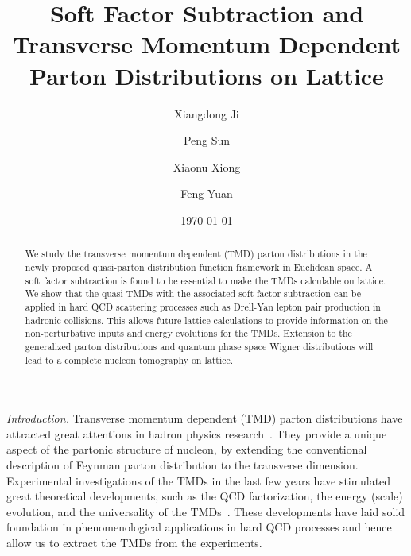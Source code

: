 \documentclass[aps,prd,preprint,tightenlines,superscriptaddress,nofootinbib]{revtex4}
\begin{document}
\title{Soft Factor Subtraction and Transverse Momentum Dependent Parton Distributions on Lattice}

\author{Xiangdong Ji}
\author{Peng Sun}
\author{Xiaonu Xiong}
\author{Feng Yuan}
\date{\today}
\vspace{0.5in}
\begin{abstract}
We study the transverse momentum dependent (TMD) parton distributions in 
the newly proposed quasi-parton distribution function framework in Euclidean
space. A soft factor subtraction is found to be essential to make the TMDs
calculable on lattice. We show that the quasi-TMDs with the associated soft
factor subtraction can be applied in hard QCD scattering 
processes such as Drell-Yan lepton pair production in hadronic collisions.
This allows future lattice calculations to provide information on
the non-perturbative inputs and energy evolutions for the TMDs.
Extension to the generalized parton distributions and quantum
phase space Wigner distributions will lead to a complete nucleon
tomography on lattice.
\end{abstract}

\maketitle

{\it Introduction.}
Transverse momentum dependent (TMD) parton distributions have attracted great attentions 
in hadron physics research~\cite{Boer:2011fh}. They provide a unique aspect
of the partonic structure of nucleon, by extending the conventional
description of Feynman parton distribution to the transverse dimension.
Experimental investigations of the TMDs in the last few years
have stimulated great theoretical developments, such as the QCD
factorization, the energy (scale) evolution, and the universality of the TMDs~\cite{Collins,Collins:1981uk,Ji:2004wu,bbdm}.
These developments have laid solid foundation in phenomenological applications
in hard QCD processes and hence allow us to extract the TMDs from the experiments. 
\end{document}
